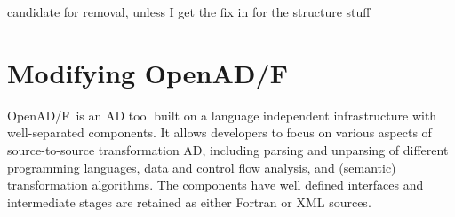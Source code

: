 \documentclass{book}
\newcommand{\OpenADF}{OpenAD/F}
\begin{document}
{\color{red} candidate for removal, unless I get the fix in for the structure stuff}

\chapter{Modifying \OpenADF}\label{sec:mods}

\OpenADF\ is an AD tool built on a language independent infrastructure with 
well-separated components. 
It 
allows developers to focus on various aspects of source-to-source 
transformation AD, including parsing and unparsing of different programming
languages, data and control flow analysis, and (semantic) transformation 
algorithms.
The components have well defined interfaces and intermediate stages 
are retained as either Fortran or XML sources. 
 
\end{document}
